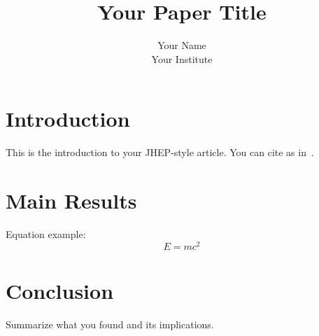 \documentclass[11pt]{JHEP}
\title{Your Paper Title}
\author{Your Name\\
Your Institute\\
\email{your.email@domain}}
\begin{document}
\section{Introduction}

This is the introduction to your JHEP-style article. You can cite as in~\cite{sample}.

\section{Main Results}

Equation example:
\begin{equation}
    E = mc^2
\end{equation}

\section{Conclusion}

Summarize what you found and its implications.



\end{document}
